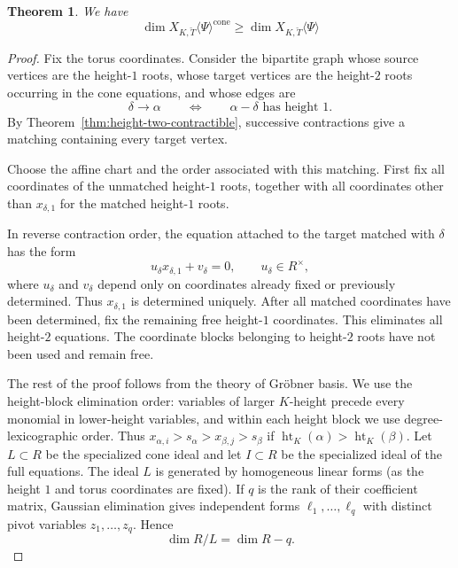 \documentclass[11pt]{amsart}
\newtheorem{thm}{Theorem}[section]
\theoremstyle{definition}
\newcommand{\bT}{\breve{T}}
\newcommand{\cone}{{\operatorname{cone}}}
\DeclareMathOperator{\Ht}{ht}
\begin{document}
\begin{thm}
We have
\[
\dim X_{K,\bT}\langle\Psi\rangle^\cone
\ge 
\dim X_{K,\bT}\langle\Psi\rangle
\]
\end{thm}

\begin{proof}
Fix the torus coordinates. Consider the bipartite graph whose source
vertices are the height-$1$ roots, whose target vertices are the height-$2$
roots occurring in the cone equations, and whose edges are
\[
\delta\longrightarrow\alpha
\qquad\Longleftrightarrow\qquad
\alpha-\delta\text{ has height }1.
\]
By Theorem~\ref{thm:height-two-contractible}, successive contractions
give a matching containing every target vertex.

Choose the affine chart and the order associated with this matching.
First fix all coordinates of the unmatched height-$1$ roots, together with
all coordinates other than $x_{\delta,1}$ for the matched height-$1$ roots.

In reverse contraction order, the equation attached to the target matched
with $\delta$ has the form
\[
u_\delta x_{\delta,1}+v_\delta=0,
\qquad u_\delta\in R^\times,
\]
where $u_\delta$ and $v_\delta$ depend only on coordinates already fixed or
previously determined. Thus $x_{\delta,1}$ is determined uniquely. After
all matched coordinates have been determined, fix the remaining free
height-$1$ coordinates. This eliminates all height-$2$ equations. The
coordinate blocks belonging to height-$2$ roots have not been used and
remain free.


The rest of the proof follows from the theory of Gr\"obner basis.
We use the height-block elimination order: variables of larger $K$-height
precede every monomial in lower-height variables, and within each height block
we use degree-lexicographic order. Thus
$x_{\alpha,i}>s_\alpha>x_{\beta,j}>s_\beta$ if
$\Ht_K(\alpha)>\Ht_K(\beta)$.
Let $L\subset R$ be the specialized cone ideal and let
$I\subset R$ be the specialized ideal of the full equations. The ideal $L$ is
generated by homogeneous linear forms
(as the height $1$ and torus coordinates are fixed). If $q$ is the rank of their coefficient
matrix, Gaussian elimination gives independent forms
$\ell_1,\ldots,\ell_q$ with distinct pivot variables
$z_1,\ldots,z_q$. Hence
\[
\dim R/L=\dim R-q.
\]


\end{proof}
\end{document}
